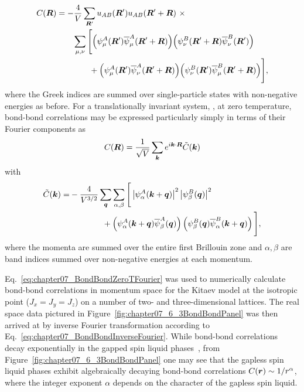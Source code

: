 %
\begin{align}
	C(\bm{R}) 	&= -\frac{4}{V} \sum_{\bm{R}'} u_{AB}(\bm{R}') u_{AB}(\bm{R}' + \bm{R})~\times \nonumber\\
			&\qquad\sum_{\mu,\nu} \Bigg[\Big(\psi_{\mu}^A(\bm{R}') \overline{\psi}_{\mu}^A(\bm{R}' + \bm{R})\Big) \Big(\psi_{\nu}^B(\bm{R}' + \bm{R}) \overline{\psi}_{\nu}^B(\bm{R}') \Big) \nonumber\\
			&\qquad\qquad+ \Big(\psi_{\mu}^A(\bm{R}') \overline{\psi}_{\nu}^A(\bm{R}' + \bm{R})\Big) \Big(\psi_{\nu}^B(\bm{R}') \overline{\psi}_{\mu}^B(\bm{R}' + \bm{R}) \Big)\Bigg],
\end{align}
%
where the Greek indices are summed over single-particle states with non-negative energies as before.
For a translationally invariant system, \eg, at zero temperature, bond-bond correlations may be expressed particularly simply in terms of their Fourier components as
%
\begin{equation}
	C(\bm{R}) = \frac{1}{\sqrt{V}} \sum_{\bm{k}} e^{\-i \bm{k}\cdot\bm{R}} \tilde{C}(\bm{k})
	\label{eq:chapter07_BondBondInverseFourier}
\end{equation}
%
with
%
\begin{align}
	\tilde{C}(\bm{k}) =	&-\frac{4}{V^{3/2}} \sum_{\bm{q}} \sum_{\alpha,\beta} \Bigg[ \left|\psi_{\alpha}^A(\bm{k} + \bm{q})\right|^2 \left|\psi_{\beta}^B(\bm{q})\right|^2 \nonumber\\
						&\qquad\qquad+ \left(\psi_{\alpha}^A(\bm{k} + \bm{q}) \overline{\psi}_{\beta}^A(\bm{q})\right) \left(\psi_{\beta}^B(\bm{q}) \overline{\psi}_{\alpha}^B(\bm{k} + \bm{q})\right) \Bigg],
	\label{eq:chapter07_BondBondZeroTFourier}
\end{align}
%
where the momenta are summed over the entire first Brillouin zone and $\alpha,\beta$ are band indices summed over non-negative energies at each momentum.

Eq.~\eqref{eq:chapter07_BondBondZeroTFourier} was used to numerically calculate bond-bond correlations in momentum space for the Kitaev model at the isotropic point ($J_x = J_y = J_z$) on a number of two- and three-dimensional lattices.
The real space data pictured in Figure~\ref{fig:chapter07_6_3BondBondPanel} was then arrived at by inverse Fourier transformation according to Eq.~\eqref{eq:chapter07_BondBondInverseFourier}.
While bond-bond correlations decay exponentially in the gapped spin liquid phases~\cite{YangPRA2008}, from Figure~\ref{fig:chapter07_6_3BondBondPanel} one may see that the gapless spin liquid phases exhibit algebraically decaying bond-bond correlations $C(\bm{r}) \sim 1/r^{\alpha}$, where the integer exponent $\alpha$ depends on the character of the gapless spin liquid.


